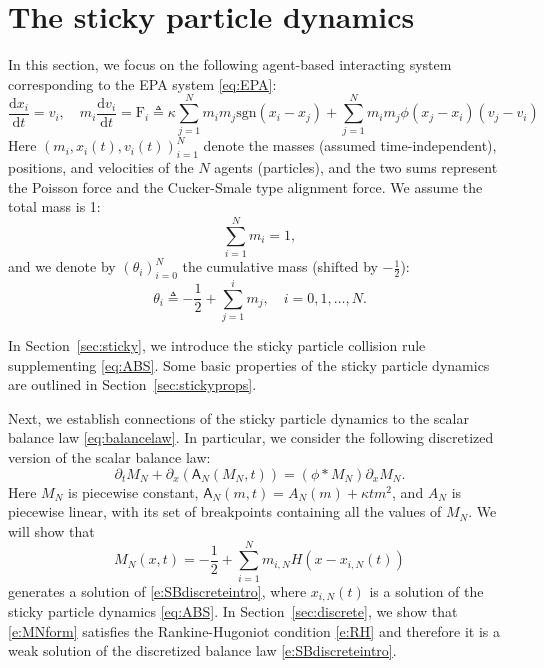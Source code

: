 \documentclass[11pt,reqno]{amsart}
\theoremstyle{definition}
\theoremstyle{remark}
\def\dd{\mathrm{d}}
\def\pa{\partial}
\def\F{\mathrm{F}}
\def\A{\mathsf{A}}
\newcommand{\sgn}[1]{\mathrm{sgn}(#1)}
\begin{document}
	\section{The sticky particle dynamics}
	\label{sec:discbalance}
	
	In this section, we focus on the following agent-based interacting system corresponding to the EPA system \eqref{eq:EPA}:
	\begin{equation}
		\label{eq:ABS}
		\frac{\dd x_i}{\dd t} = v_i,\quad
		m_i\frac{\dd v_i}{\dd t} = \F_i \triangleq \kappa\sum_{j=1}^N m_im_j \sgn{x_i-x_j} + \sum_{j=1}^N m_im_j \phi(x_j - x_i) (v_j - v_i)
	\end{equation}
	Here $(m_i,x_i(t), v_i(t))_{i=1}^N$ denote the masses (assumed time-independent), positions, and velocities of the $N$ agents (particles), and the two sums represent the Poisson force and the Cucker-Smale type alignment force. We assume the total mass is 1:
	\[ \sum_{i=1}^N m_i = 1,\]
	and we denote by $(\theta_i)_{i=0}^N$ the cumulative mass (shifted by $-\frac12$):
	\[
	\theta_i \triangleq -\frac{1}{2}+\sum_{j=1}^i m_j,\quad i=0,1,\ldots,N.
	\]

	
	In Section~\ref{sec:sticky}, we introduce the sticky particle collision rule supplementing \eqref{eq:ABS}. Some basic properties of the sticky particle dynamics are outlined in Section~\ref{sec:stickyprops}.  
	
	Next, we establish connections of the sticky particle dynamics to the scalar balance law \eqref{eq:balancelaw}. In particular, we consider the following discretized version of the scalar balance law:
	\begin{equation}
		\label{e:SBdiscreteintro}
		\pa_t M_N + \pa_x(\A_N(M_N,t)) = (\phi\ast M_N) \pa_x M_N.
	\end{equation} 
	Here $M_N$ is piecewise constant, $\A_N(m,t) = A_N(m) + \kappa t m^2$, and $A_N$ is piecewise linear, with its set of breakpoints containing all the values of $M_N$. We will show that 
	\begin{equation} 
		\label{e:MNform}
		M_N(x,t) = -\frac12 + \sum_{i=1}^N m_{i,N} H(x - x_{i,N}(t))
	\end{equation} 
	generates a solution of \eqref{e:SBdiscreteintro}, where  $x_{i,N}(t)$ is a solution of the sticky particle dynamics \eqref{eq:ABS}. 
	In Section~\ref{sec:discrete}, we show that \eqref{e:MNform} satisfies the Rankine-Hugoniot condition \eqref{e:RH} and therefore it is a weak solution of the discretized balance law \eqref{e:SBdiscreteintro}.
	
\end{document}
